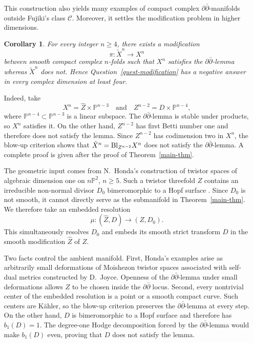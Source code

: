 \documentclass[11pt]{amsart}
\numberwithin{equation}{section}
\def\Bl{{\rm Bl}}
\theoremstyle{plain}
\newtheorem{cor}[thm]{Corollary}
\theoremstyle{definition}
\begin{document}
This construction also yields many examples of compact complex
$\partial\bar\partial$-manifolds outside Fujiki's class $\mathcal C$.
Moreover, it settles the modification problem in higher dimensions.

\begin{cor}\label{cor-alessandrini-negative}
For every integer $n\geq4$, there exists a modification
\[
\pi:\tilde{X}^{n}\longrightarrow X^{n}
\]
between smooth compact complex $n$-folds such that $X^{n}$ satisfies the
$\partial\bar\partial$-lemma whereas $\tilde{X}^{n}$ does not.  Hence
Question~\ref{quest-modification} has a negative answer in every complex
dimension at least four.
\end{cor}

Indeed, take
\[
X^{n}=\widehat Z\times\mathbb P^{n-3}
\quad\text{and}\quad
Z^{n-2}=D\times\mathbb P^{n-4},
\]
where $\mathbb P^{n-4}\subset\mathbb P^{n-3}$ is a linear subspace.  The
$\partial\bar\partial$-lemma is stable under products, so $X^{n}$ satisfies
it.  On the other hand, $Z^{n-2}$ has first Betti number one and therefore does
not satisfy the lemma.  Since $Z^{n-2}$ has codimension two in $X^{n}$, the blow-up
criterion shows that $\tilde{X}^{n}=\Bl_{Z^{n-2}}X^{n}$ does not satisfy the
$\partial\bar\partial$-lemma.  A complete proof is given after the proof of
Theorem~\ref{main-thm}.

The geometric input comes from N.~Honda's construction of twistor spaces of
algebraic dimension one on $n\mathbb P^2$, $n\geq5$.  Such a twistor threefold $Z$
contains an irreducible non-normal divisor $D_0$ bimeromorphic to a Hopf
surface \cite[Proposition 3.7.(ii) and Theorem 3.11.(ii)]{Hn15}.  Since $D_0$
is not smooth, it cannot directly serve as the submanifold in
Theorem~\ref{main-thm}.  We therefore take an embedded resolution
\[
 \mu:(\widehat Z,D)\longrightarrow(Z,D_0).
\]
This simultaneously resolves $D_0$ and embeds its smooth strict transform
$D$ in the smooth modification $\widehat Z$ of $Z$.

Two facts control the ambient manifold.  First, Honda's examples arise as
arbitrarily small deformations of Moishezon twistor spaces associated with
self-dual metrics constructed by D.~Joyce.  Openness of the
$\partial\bar\partial$-lemma under small deformations allows $Z$ to be chosen
inside the $\partial\bar\partial$ locus.  Second, every nontrivial center of
the embedded resolution is a point or a smooth compact curve.  Such centers
are K\"ahler, so the blow-up criterion preserves the
$\partial\bar\partial$-lemma at every step.  On the other hand, $D$ is
bimeromorphic to a Hopf surface and therefore has $b_1(D)=1$.  The
degree-one Hodge decomposition forced by the $\partial\bar\partial$-lemma
would make $b_1(D)$ even, proving that $D$ does not satisfy the lemma.
\end{document}
